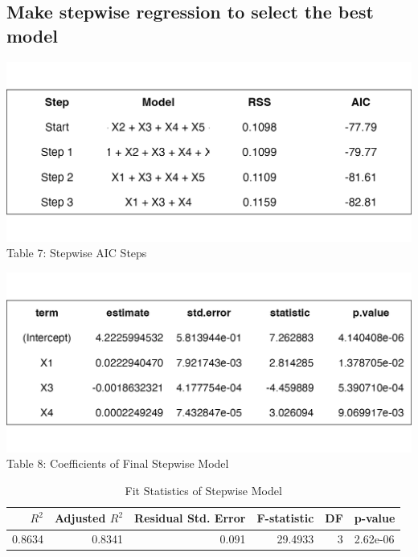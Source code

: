 \documentclass[
  11pt,
]{article}
\begin{document}
\subsection{Make stepwise regression to select the best
model}\label{make-stepwise-regression-to-select-the-best-model}

\begin{minipage}{0.48\textwidth}
\centering
\includegraphics[width=\linewidth]{stepwise_aic_table.png}
\vspace{-0.3em}
\footnotesize Table 7: Stepwise AIC Steps
\end{minipage}
\hfill
\begin{minipage}{0.48\textwidth}
\centering
\includegraphics[width=\linewidth]{stepwise_coef_table.png}\\
\vspace{-0.3em}
\footnotesize Table 8: Coefficients of Final Stepwise Model
\end{minipage}

\addtocounter{table}{2}

\begin{table}[!h]
\centering
\caption{\label{tab:unnamed-chunk-8}Fit Statistics of Stepwise Model}
\centering
\fontsize{8}{10}\selectfont
\begin{tabular}[t]{rrrrrl}
\toprule
$R^2$ & Adjusted $R^2$ & Residual Std. Error & F-statistic & DF & p-value\\
\midrule
0.8634 & 0.8341 & 0.091 & 29.4933 & 3 & 2.62e-06\\
\bottomrule
\end{tabular}
\end{table}
\end{document}
